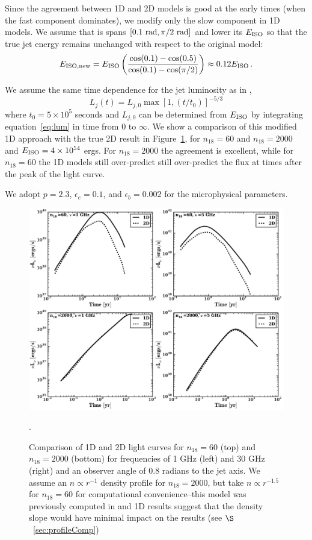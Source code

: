 \documentclass[usenatbib,fleqn]{mnras}
\begin{document}
Since the agreement between 1D and 2D models is good at the early
times (when the fast component dominates), we modify only the slow
component in 1D models. We assume that is spans $[0.1\ {\rm rad},
\pi/2\ {\rm rad}]$ and lower its $E_{\rm ISO}$ so that the true jet
energy remains unchanged with respect to the original model:
\begin{equation}\label{eq:Eiso}
 E_{\rm ISO, new} = E_{\rm ISO} \left(\frac{\cos(0.1) - \cos(0.5)}{\cos(0.1) - \cos(\pi/2)}\right)\approx 0.12 E_{\rm ISO}\, .
\end{equation}

We assume the same time dependence for the jet luminosity as in
\citet{Mimica+2015},
\begin{equation}\label{eq:lum}
L_j(t) = L_{j,0}\max\left[1, (t/t_0)\right]^{-5/3}
\end{equation}
where $t_0 = 5\times 10^5$ seconds and $L_{j, 0}$ can be determined
from $E_{\rm ISO}$ by integrating equation~\ref{eq:lum} in time from
$0$ to $\infty$. We show a comparison of this modified 1D approach
with the true 2D result in Figure~\ref{fig:1D2DB}, for $n_{18}=60$ and
$n_{18}=2000$ and $E_{\rm ISO}=4 \times 10^{54}$ ergs. For
$n_{18}=2000$ the agreement is excellent, while for $n_{18}=60$ the 1D
models still over-predict still over-predict the flux at times after
the peak of the light curve.

We adopt $p=2.3$, $\epsilon_e=0.1$, and $\epsilon_b=0.002$ for the
microphysical parameters. 



\begin{figure}
\includegraphics[width=16cm]{1D_2D.pdf}
\caption{\label{fig:1D2DB} Comparison of 1D and 2D light curves for
  $n_{18}=60$ (top) and $n_{18}=2000$ (bottom) for frequencies of 1
  GHz (left) and 30 GHz (right) and an observer angle of 0.8 radians
  to the jet axis. We assume an $n\propto r^{-1}$ density profile for
  $n_{18}=2000$, but take $n\propto r^{-1.5}$ for $n_{18}=60$ for
  computational convenience--this model was previously computed in
  \citet{Mimica+2015} and 1D results suggest that the density slope would
  have minimal impact on the results (see $\S$~\ref{sec:profileComp})}.
\end{figure}
\end{document}
